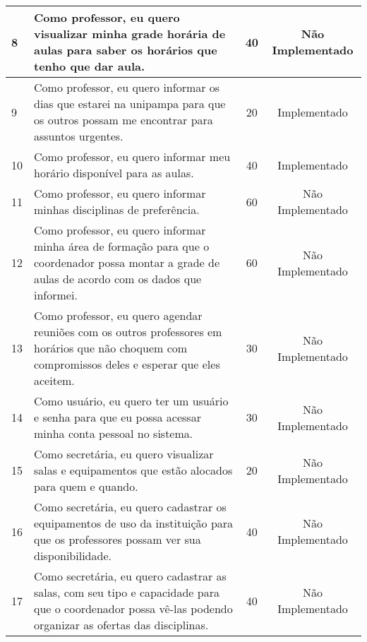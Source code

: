 \begin{landscape}
\begin{longtable}{|p{0.5in}|p{6in}|c|c|}
		\hline \rowcolor{cNaoImplementado}
		         8 & Como professor, eu quero visualizar minha grade horária de aulas para saber os horários que tenho que dar aula. &         40 & Não Implementado \\
		
		\hline \rowcolor{cImplementado}
		         9 & Como professor, eu quero informar os dias que estarei na unipampa para que os outros possam me encontrar para assuntos urgentes.  &         20 & Implementado \\
		
		\hline	\rowcolor{cImplementado}
		        10 & Como professor, eu quero informar meu horário disponível para as aulas. &         40 & Implementado \\
		
		\hline	\rowcolor{cNaoImplementado}
				11 & Como professor, eu quero informar minhas disciplinas de preferência. & 			60 & Não Implementado \\	
		
		\hline	\rowcolor{cNaoImplementado}
				12 & Como professor, eu quero informar minha área de formação para que o coordenador possa montar a grade de aulas de acordo com os dados que informei. & 60 & Não Implementado \\
		
		\hline	\rowcolor{cNaoImplementado}
		        13 & Como professor, eu quero agendar reuniões com os outros professores em horários que não choquem com compromissos deles e esperar que eles aceitem.  &         30 & Não Implementado \\
		
		\hline \rowcolor{cNaoImplementado}
		        14 & Como usuário, eu quero ter um usuário e senha para que eu possa acessar minha conta pessoal no sistema. &         30 & Não Implementado \\
		
		\hline \rowcolor{cNaoImplementado}
		        15 & Como secretária, eu quero visualizar salas e equipamentos que estão alocados para quem e quando.  &         20 & Não Implementado \\
		
		\hline \rowcolor{cNaoImplementado}
		        16 & Como secretária, eu quero cadastrar os equipamentos de uso da instituição para que os professores possam ver sua disponibilidade.  &         40 & Não Implementado \\
		
		\hline \rowcolor{cNaoImplementado}
		        17 & Como secretária, eu quero cadastrar as salas, com seu tipo e capacidade para que o coordenador possa vê-las podendo organizar as ofertas das disciplinas. &         40 & Não Implementado \\
		

\end{longtable}
\end{landscape}
